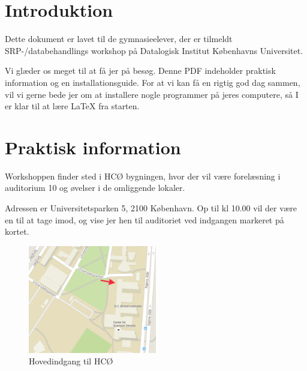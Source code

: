 \documentclass{article}                                                        %
\begin{document}
\section{Introduktion}
    Dette dokument er lavet til de gymnasieelever, der er tilmeldt
    SRP-/databehandlings workshop på Datalogisk Institut Københavns Universitet.

    Vi glæder os meget til at få jer på besøg. Denne PDF indeholder praktisk
    information og en installationsguide. For at vi kan få en rigtig god
    dag sammen, vil vi gerne bede jer om at installere nogle programmer på jeres
    computere, så I er klar til at lære LaTeX fra starten.


\section{Praktisk information}
    Workshoppen finder sted i HCØ bygningen, hvor der vil være forelæsning i
    auditorium 10 og øvelser i de omliggende  lokaler.

    Adressen er Universitetsparken 5, 2100 København.
    Op til kl 10.00 vil der være en til at tage imod, og vise jer hen til
    auditoriet ved indgangen markeret på kortet.
    \begin{figure}[h!]
        \caption{Hovedindgang til HCØ}
        \centering
        \includegraphics[width=0.5\textwidth]{./include/kort.png}
    \end{figure}
\end{document}
